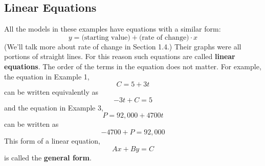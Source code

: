 \documentclass[10pt,]{book}
\newcommand{\terminology}[1]{\textbf{#1}}
\theoremstyle{plain}
\theoremstyle{definition}
\theoremstyle{definition}
\theoremstyle{definition}
\theoremstyle{definition}
\theoremstyle{definition}
\numberwithin{equation}{section}
\begin{document}
\subsection[Linear Equations]{Linear Equations}\label{subsection-3}
All the models in these examples have equations with a similar form:  \begin{equation*}y=\text{(starting value)}+\text{(rate of change)}\cdot x\end{equation*}
(We'll talk more about rate of change in Section 1.4.)  Their graphs were all portions of straight lines.  For this reason such equations are called  \terminology{linear equations}.  The order of the terms in the equation does not matter.  For example, the equation in Example 1, \begin{equation*}C=5+3t\end{equation*} can be written equivalently as \begin{equation*}-3t+C=5\end{equation*} and the equation in Example 3, \begin{equation*}P=92,000+4700t\end{equation*} can be written as \begin{equation*}-4700+P=92,000\end{equation*} 
This form of a linear equation, \begin{equation*}Ax+By=C\end{equation*} is called the \terminology{general form}.%
\typeout{************************************************}
\typeout{************************************************}
\end{document}

